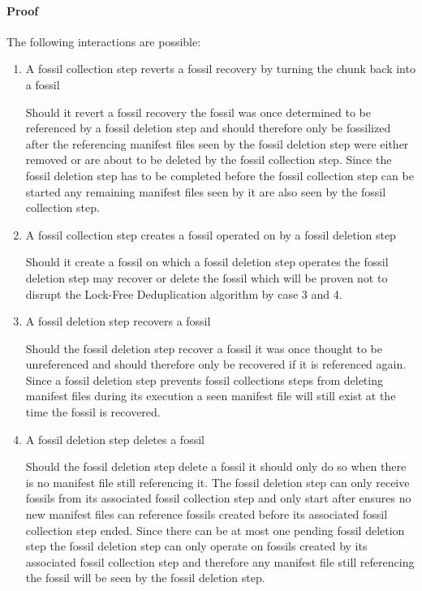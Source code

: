 \paragraph{Proof} The following interactions are possible:
\begin{enumerate}
    \item A fossil collection step reverts a fossil recovery by turning the chunk back into a fossil

        Should it revert a fossil recovery the fossil was once determined to be
        referenced by a fossil deletion step and should therefore only be fossilized
        after the referencing manifest files seen by the fossil deletion step were
        either removed or are about to be deleted by the fossil collection step.
        Since the fossil deletion step has to be completed before the fossil collection
        step can be started any remaining manifest files seen by it are also seen by the
        fossil collection step.

    \item A fossil collection step creates a fossil operated on by a fossil deletion step

        Should it create a fossil on which a fossil deletion step operates the
        fossil deletion step may recover or delete the fossil which will be proven
        not to disrupt the Lock-Free Deduplication algorithm by case 3 and 4.

    \item A fossil deletion step recovers a fossil

        Should the fossil deletion step recover a fossil it was once thought to be
        unreferenced and should therefore only be recovered if it is referenced again.
        Since a fossil deletion step prevents fossil collections steps from deleting
        manifest files during its execution a seen manifest file will still exist at
        the time the fossil is recovered.

    \item A fossil deletion step deletes a fossil

        Should the fossil deletion step delete a fossil it should only do so when
        there is no manifest file still referencing it.
        The fossil deletion step can only receive fossils from its associated
        fossil collection step and only start after 
        ensures no new manifest files can reference fossils created before its
        associated fossil collection step ended.
        Since there can be at most one pending fossil deletion step the fossil
        deletion step can only operate on fossils created by its associated fossil
        collection step and therefore any manifest file still referencing the fossil
        will be seen by the fossil deletion step.


\end{enumerate}
